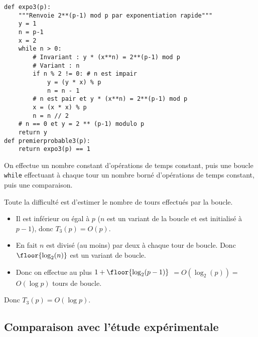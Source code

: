 \begin{lstlisting}
def expo3(p):     
    """Renvoie 2**(p-1) mod p par exponentiation rapide"""
    y = 1
    n = p-1
    x = 2
    while n > 0:
        # Invariant : y * (x**n) = 2**(p-1) mod p
        # Variant : n
        if n % 2 != 0: # n est impair
            y = (y * x) % p
            n = n - 1
        # n est pair et y * (x**n) = 2**(p-1) mod p
        x = (x * x) % p
        n = n // 2
    # n == 0 et y = 2 ** (p-1) modulo p
    return y
def premierprobable3(p):
    return expo3(p) == 1
\end{lstlisting}


On effectue un nombre constant d'opérations de temps constant, puis
une boucle \texttt{while} effectuant à chaque tour un nombre borné
d'opérations de temps constant, puis une comparaison.

Toute la difficulté est d'estimer le nombre de tours effectués par la
boucle.
\begin{itemize}
\item[\textbullet] Il est inférieur ou égal à $p$ ($n$ est un variant de la
  boucle et est initialisé à $p-1$), donc $T_{3}(p)=O(p)$.
\item[\textbullet] En fait $n$
  est divisé (au moins) par deux à chaque tour de boucle. Donc
  $\floor{\log_{2}(n)}$ est un variant de boucle.
\item[\textbullet] Donc on effectue au
  plus $1+ \floor{\log_{2}(p-1)}$ $= O(\log_{2}(p)) =$ $ O(\log p)$ tours de boucle.
\end{itemize}
Donc $T_{3}(p) = O(\log p)$.


\subsection{Comparaison avec l'étude expérimentale}

